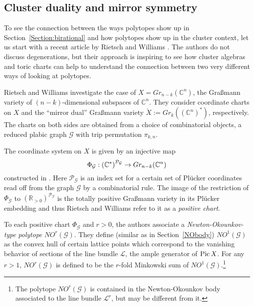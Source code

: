 \documentclass{emsprocart}
\theoremstyle{definition}
\begin{document}
\subsection{Cluster duality and mirror symmetry} \label{RietschWilliams}  
To see the connection between the ways polytopes show up in Section~\ref{Section:birational} and how polytopes
show up in the cluster context, let us start with a recent article by Rietsch and Williams \cite{RW}.
The authors do not discuss degenerations, but their approach is inspiring to see how cluster algebras and toric charts 
can help to understand the connection between two very different ways of looking at polytopes.

Rietsch and Williams investigate the case of $X=Gr_{n-k}(\mathbb C^n)$, the Gra\ss mann variety of $(n-k)$-dimensional 
subspaces of $\mathbb C^n$. They consider coordinate charts on $X$ and the ``mirror dual'' Gra\ss mann variety 
$\check{X}:=Gr_{k}\left(\left(\mathbb{C}^n\right)^*\right)$, respectively. The charts on both sides are 
obtained from a choice of combinatorial objects, a reduced plabic graph $\mathcal{G}$ with trip permutation $\pi_{k,n}$. 

The coordinate system on $X$ is given by an injective map
\begin{equation}\label{eq:ytransformation}
\Phi_{\mathcal G}\index{$\Phi_{\mathcal G}$, the positive chart associated to a plabic graph $\mathcal{G}$}: \left(\mathbb{C}^*\right)^{\mathcal{P}_{\mathcal{G}}}\rightarrow Gr_{n-k}(\mathbb C^n)
\end{equation} 
constructed in \cite{T}. Here $\mathcal{P}_{\mathcal{G}}$ is an index set for a certain set of Pl\"ucker coordinates read off 
from the graph $\mathcal{G}$ by a combinatorial rule. The image of the restriction of $\Phi_{\mathcal G}$ to 
$\left(\mathbb{R}_{>0}\right)^{\mathcal{P}_{\mathcal{G}}}$ is the totally positive Gra\ss mann variety in its Pl\"ucker 
embedding and thus Rietsch and Williams refer to it as a {\it positive chart}.

To each positive chart $\Phi_{\mathcal G}$ and $r>0$, the authors associate
a \textit{Newton-Okounkov-type polytope} $NO^r(\mathcal G)$. They define (similar as in Section~\ref{NObody}) $NO^1(\mathcal G)$
as the convex hull of certain lattice points which correspond to the vanishing behavior of sections of the line bundle
$\mathcal L$, the ample generator of ${\rm Pic\,} X$. For any $r>1$, $NO^r(\mathcal{G})$ is defined to be the $r$-fold Minkowski sum of $NO^1(\mathcal{G})$.\footnote{The polytope $NO^r(\mathcal{G})$ is contained in the Newton-Okounkov body associated to the line bundle $\mathcal{L}^r$, but may be different from it.}
 
\end{document}

